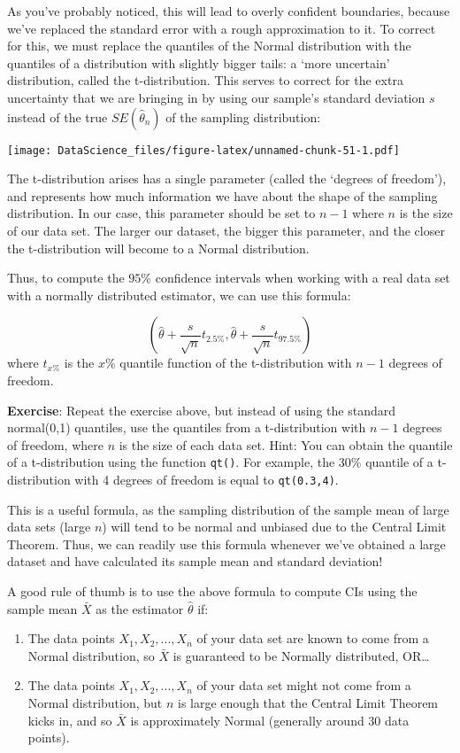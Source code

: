 \documentclass[
]{book}
\begin{document}
As you've probably noticed, this will lead to overly confident boundaries, because we've replaced the standard error with a rough approximation to it. To correct for this, we must replace the quantiles of the Normal distribution with the quantiles of a distribution with slightly bigger tails: a `more uncertain' distribution, called the t-distribution. This serves to correct for the extra uncertainty that we are bringing in by using our sample's standard deviation \(s\) instead of the true \(SE(\hat{\theta}_n)\) of the sampling distribution:

\texttt{[image: DataScience\_files/figure-latex/unnamed-chunk-51-1.pdf]}

The t-distribution arises has a single parameter (called the `degrees of freedom'), and represents how much information we have about the shape of the sampling distribution. In our case, this parameter should be set to \(n-1\) where \(n\) is the size of our data set. The larger our dataset, the bigger this parameter, and the closer the t-distribution will become to a Normal distribution.

Thus, to compute the \(95\%\) confidence intervals when working with a real data set with a normally distributed estimator, we can use this formula:

\[(\hat{\theta} + \frac{s}{\sqrt{n}}t_{2.5\%}, \hat{\theta} + \frac{s}{\sqrt{n}}t_{97.5\%})\]
where \(t_{x\%}\) is the \(x\%\) quantile function of the t-distribution with \(n-1\) degrees of freedom.

\textbf{Exercise}: Repeat the exercise above, but instead of using the standard normal(0,1) quantiles, use the quantiles from a t-distribution with \(n-1\) degrees of freedom, where \(n\) is the size of each data set. Hint: You can obtain the quantile of a t-distribution using the function \texttt{qt()}. For example, the \(30\%\) quantile of a t-distribution with 4 degrees of freedom is equal to \texttt{qt(0.3,4)}.

This is a useful formula, as the sampling distribution of the sample mean of large data sets (large \(n\)) will tend to be normal and unbiased due to the Central Limit Theorem. Thus, we can readily use this formula whenever we've obtained a large dataset and have calculated its sample mean and standard deviation!

A good rule of thumb is to use the above formula to compute CIs using the sample mean \(\bar{X}\) as the estimator \(\hat{\theta}\) if:

\begin{enumerate}
\def\labelenumi{\arabic{enumi}.}
\item
  The data points \(X_1, X_2, ..., X_n\) of your data set are known to come from a Normal distribution, so \(\bar{X}\) is guaranteed to be Normally distributed, OR\ldots{}
\item
  The data points \(X_1, X_2, ..., X_n\) of your data set might not come from a Normal distribution, but \(n\) is large enough that the Central Limit Theorem kicks in, and so \(\bar{X}\) is approximately Normal (generally around 30 data points).
\end{enumerate}
\end{document}
